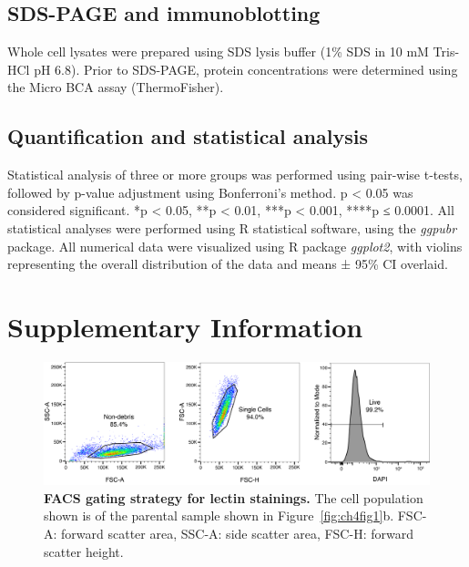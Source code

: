 \subsection{SDS-PAGE and immunoblotting}

Whole cell lysates were prepared using SDS lysis buffer (1\% SDS in 10 mM Tris-HCl pH 6.8). Prior to SDS-PAGE, protein concentrations were determined using the Micro BCA assay (ThermoFisher). 

\subsection{Quantification and statistical analysis}

Statistical analysis of three or more groups was performed using pair-wise t-tests, followed by p-value adjustment using Bonferroni’s method. p < 0.05 was considered significant. *p < 0.05, **p < 0.01, ***p < 0.001, ****p ≤ 0.0001. All statistical analyses were performed using R statistical software, using the \emph{ggpubr} package. All numerical data were visualized using R package \emph{ggplot2}\cite{wickham_ggplot2:_2016}, with violins representing the overall distribution of the data and means ± 95\% CI overlaid. 

\clearpage

\section{Supplementary Information}

\begin{figure}[h]
    \centering
    \includegraphics[keepaspectratio=true,width=\textwidth]{chapters/chapter4/chapter4_SupplementaryFigure1.pdf}
    \caption{\textbf{FACS gating strategy for lectin stainings.} The cell population shown is of the parental sample shown in Figure~\ref{fig:ch4fig1}b. FSC-A: forward scatter area, SSC-A: side scatter area, FSC-H: forward scatter height.}
    \label{fig:ch4supfig1}
\end{figure}

\clearpage

